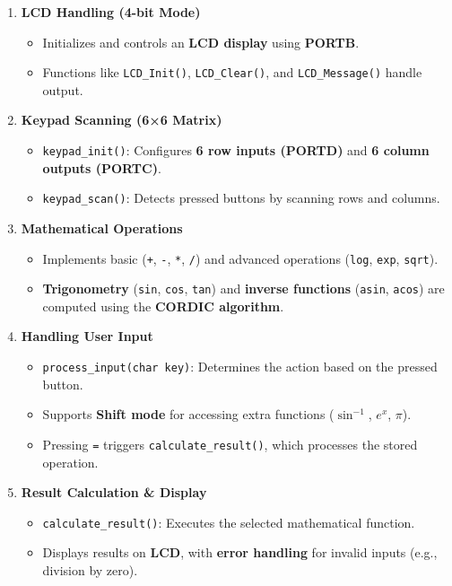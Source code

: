 \documentclass{article}
\begin{document}
\begin{enumerate}
    \item \textbf{LCD Handling (4-bit Mode)}
    \begin{itemize}
        \item Initializes and controls an \textbf{LCD display} using \textbf{PORTB}.
        \item Functions like \texttt{LCD\_Init()}, \texttt{LCD\_Clear()}, and \texttt{LCD\_Message()} handle output.
    \end{itemize}
    
    \item \textbf{Keypad Scanning (6×6 Matrix)}
    \begin{itemize}
        \item \texttt{keypad\_init()}: Configures \textbf{6 row inputs (PORTD)} and \textbf{6 column outputs (PORTC)}.
        \item \texttt{keypad\_scan()}: Detects pressed buttons by scanning rows and columns.
    \end{itemize}
    
    \item \textbf{Mathematical Operations}
    \begin{itemize}
        \item Implements basic (\texttt{+}, \texttt{-}, \texttt{*}, \texttt{/}) and advanced operations (\texttt{log}, \texttt{exp}, \texttt{sqrt}).
        \item \textbf{Trigonometry} (\texttt{sin}, \texttt{cos}, \texttt{tan}) and \textbf{inverse functions} (\texttt{asin}, \texttt{acos}) are computed using the \textbf{CORDIC algorithm}.
    \end{itemize}
    
    \item \textbf{Handling User Input}
    \begin{itemize}
        \item \texttt{process\_input(char key)}: Determines the action based on the pressed button.
        \item Supports \textbf{Shift mode} for accessing extra functions (\(\sin^{-1}\), \(e^x\), \(\pi\)).
        \item Pressing \texttt{=} triggers \texttt{calculate\_result()}, which processes the stored operation.
    \end{itemize}
    
    \item \textbf{Result Calculation \& Display}
    \begin{itemize}
        \item \texttt{calculate\_result()}: Executes the selected mathematical function.
        \item Displays results on \textbf{LCD}, with \textbf{error handling} for invalid inputs (e.g., division by zero).
    \end{itemize}
    

\end{enumerate}
\end{document}
